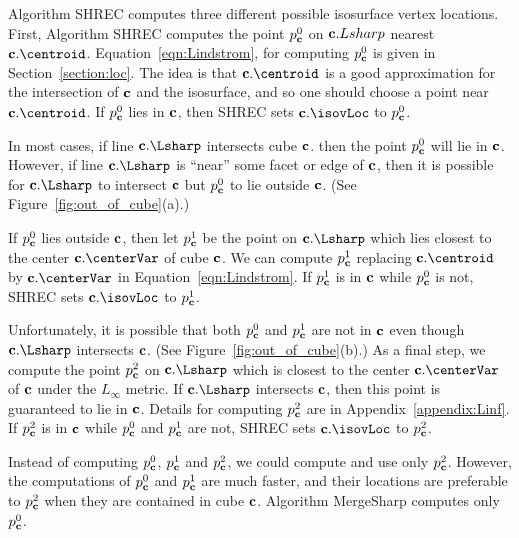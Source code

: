 Algorithm SHREC computes three different possible isosurface vertex locations.
First, Algorithm SHREC computes the point $p^0_{\mathbf{c}}$ 
on $\mathbf{c}.Lsharp$ nearest $\cb.\centroid$.
Equation~\ref{eqn:Lindstrom}, for computing $p^0_{\mathbf{c}}$ is given
in Section~\ref{section:loc}.
The idea is that $\cb.\centroid$ is a good approximation
for the intersection of $\mathbf{c}$ and the isosurface,
and so one should choose a point near $\cb.\centroid$.
If $p^0_{\mathbf{c}}$ lies in $\mathbf{c}$, then SHREC sets $\cb.\isovLoc$ to $p^0_{\mathbf{c}}$.

In most cases, if line $\cb.\Lsharp$ intersects cube $\mathbf{c}$.
then the point $p^0_{\mathbf{c}}$ will lie in $\mathbf{c}$.
However, if line $\cb.\Lsharp$ is ``near'' some facet or edge of $\mathbf{c}$,
then it is possible for $\cb.\Lsharp$ to intersect $\mathbf{c}$
but $p^0_{\mathbf{c}}$ to lie outside $\mathbf{c}$.
(See Figure~\ref{fig:out_of_cube}(a).)

If $p^0_{\mathbf{c}}$ lies outside $\mathbf{c}$,
then let $p^1_{\mathbf{c}}$ be the point on $\cb.\Lsharp$ which lies closest 
to the center $\cb.\centerVar$ of cube $\mathbf{c}$.
We can compute $p^1_{\mathbf{c}}$ replacing $\cb.\centroid$ by $\cb.\centerVar$
in Equation~\ref{eqn:Lindstrom}.
If $p^1_{\mathbf{c}}$ is in $\mathbf{c}$ while $p^0_{\mathbf{c}}$ is not,
SHREC sets $\cb.\isovLoc$ to $p^1_{\mathbf{c}}$.

Unfortunately, it is possible that both $p^0_{\mathbf{c}}$ and $p^1_{\mathbf{c}}$ 
are not in $\mathbf{c}$ even though $\cb.\Lsharp$ intersects $\mathbf{c}$.
(See Figure~\ref{fig:out_of_cube}(b).)
As a final step, we compute the point $p^2_{\mathbf{c}}$ on $\cb.\Lsharp$ 
which is closest to the center $\cb.\centerVar$ of $\mathbf{c}$ 
under the $L_\infty$ metric.
If $\cb.\Lsharp$ intersects $\mathbf{c}$, 
then this point is guaranteed to lie in $\mathbf{c}$.
Details for computing $p^2_{\mathbf{c}}$ are in Appendix~\ref{appendix:Linf}.
If $p^2_{\mathbf{c}}$ is in $\mathbf{c}$ while $p^0_{\mathbf{c}}$ and $p^1_{\mathbf{c}}$ are not,
SHREC sets $\cb.\isovLoc$ to $p^2_{\mathbf{c}}$.

Instead of computing $p^0_{\mathbf{c}}$, $p^1_{\mathbf{c}}$ and $p^2_{\mathbf{c}}$, 
we could compute and use only $p^2_{\mathbf{c}}$.
However, the computations of $p^0_{\mathbf{c}}$ and $p^1_{\mathbf{c}}$ are much faster,
and their locations are preferable to $p^2_{\mathbf{c}}$ when they are
contained in cube $\mathbf{c}$.
Algorithm MergeSharp computes only $p^0_{\mathbf{c}}$.


